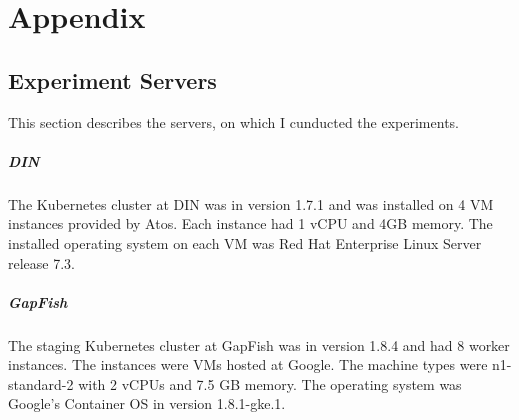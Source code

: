 \chapter*{Appendix}
\section*{Experiment Servers}
This section describes the servers, on which I cunducted the experiments.
\paragraph*{DIN}
The Kubernetes cluster at DIN was in version 1.7.1 and was installed on 4 VM instances
provided by Atos. Each instance had 1 vCPU and 4GB memory. The installed operating system
on each VM was Red Hat Enterprise Linux Server release 7.3.
\paragraph*{GapFish}
The staging Kubernetes cluster at GapFish was in version 1.8.4 and had 8 worker
instances. The instances were VMs hosted at Google. The machine types were n1-standard-2
with 2 vCPUs and 7.5 GB memory. The operating system was Google's Container OS in version
1.8.1-gke.1.
